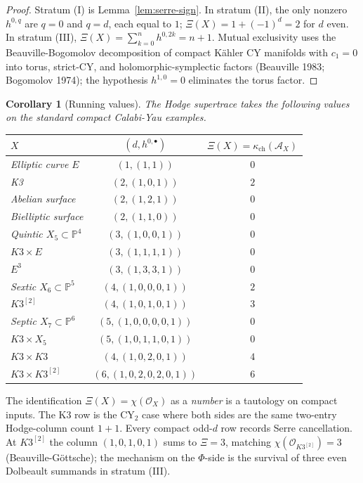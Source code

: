 \documentclass[11pt]{article}
\newtheorem{corollary}[theorem]{Corollary}
\providecommand{\cA}{\mathcal{A}}
\providecommand{\cO}{\mathcal{O}}
\begin{document}
\begin{proof}
Stratum (I) is Lemma~\ref{lem:serre-sign}. In stratum (II), the only
nonzero $h^{0,q}$ are $q=0$ and $q=d$, each equal to $1$; $\Xi(X)=1+(-1)^{d}=2$
for $d$ even. In stratum (III), $\Xi(X)=\sum_{k=0}^{n}h^{0,2k}=n+1$.
Mutual exclusivity uses the Beauville-Bogomolov decomposition of
compact K\"ahler CY manifolds with $c_{1}=0$ into torus, strict-CY, and
holomorphic-symplectic factors (Beauville 1983; Bogomolov 1974); the
hypothesis $h^{1,0}=0$ eliminates the torus factor.
\end{proof}

\begin{corollary}[Running values]
\label{cor:running-values}
The Hodge supertrace takes the following values on the standard compact
Calabi-Yau examples.
\begin{center}
\begin{tabular}{lcc}
\toprule
$X$ & $(d,h^{0,\bullet})$ & $\Xi(X)=\kappa_{\mathrm{ch}}(\cA_X)$\\
\midrule
Elliptic curve $E$ & $(1,(1,1))$ & $0$\\
K3 & $(2,(1,0,1))$ & $2$\\
Abelian surface & $(2,(1,2,1))$ & $0$\\
Bielliptic surface & $(2,(1,1,0))$ & $0$\\
Quintic $X_{5}\subset\mathbb{P}^{4}$ & $(3,(1,0,0,1))$ & $0$\\
$K3\times E$ & $(3,(1,1,1,1))$ & $0$\\
$E^{3}$ & $(3,(1,3,3,1))$ & $0$\\
Sextic $X_{6}\subset\mathbb{P}^{5}$ & $(4,(1,0,0,0,1))$ & $2$\\
$K3^{[2]}$ & $(4,(1,0,1,0,1))$ & $3$\\
Septic $X_{7}\subset\mathbb{P}^{6}$ & $(5,(1,0,0,0,0,1))$ & $0$\\
$K3\times X_{5}$ & $(5,(1,0,1,1,0,1))$ & $0$\\
$K3\times K3$ & $(4,(1,0,2,0,1))$ & $4$\\
$K3\times K3^{[2]}$ & $(6,(1,0,2,0,2,0,1))$ & $6$\\
\bottomrule
\end{tabular}
\end{center}
\end{corollary}

The identification $\Xi(X)=\chi(\cO_X)$ as a \emph{number} is a
tautology on compact inputs. The K3 row is the CY$_2$ case where both
sides are the same two-entry Hodge-column count \(1+1\). Every compact
odd-$d$ row records Serre cancellation. At $K3^{[2]}$ the column
$(1,0,1,0,1)$ sums to $\Xi=3$, matching
$\chi(\cO_{K3^{[2]}})=3$ (Beauville-G\"ottsche); the mechanism on the
$\Phi$-side is the survival of three even Dolbeault summands in
stratum (III).
\end{document}
